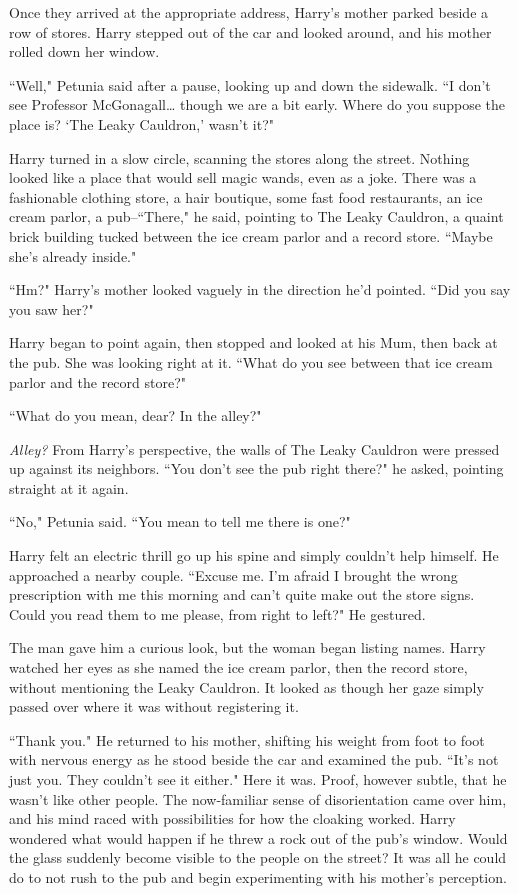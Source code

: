 Once they arrived at the appropriate address, Harry's mother parked beside a row of stores. Harry stepped out of the car and looked around, and his mother rolled down her window.

``Well," Petunia said after a pause, looking up and down the sidewalk. ``I don't see Professor McGonagall{\ldots} though we are a bit early. Where do you suppose the place is? `The Leaky Cauldron,' wasn't it?"

Harry turned in a slow circle, scanning the stores along the street. Nothing looked like a place that would sell magic wands, even as a joke. There was a fashionable clothing store, a hair boutique, some fast food restaurants, an ice cream parlor, a pub\---``There," he said, pointing to The Leaky Cauldron, a quaint brick building tucked between the ice cream parlor and a record store. ``Maybe she's already inside."

``Hm?" Harry's mother looked vaguely in the direction he'd pointed. ``Did you say you saw her?"

Harry began to point again, then stopped and looked at his Mum, then back at the pub. She was looking right at it. ``What do you see between that ice cream parlor and the record store?"

``What do you mean, dear? In the alley?"

\emph{Alley?} From Harry's perspective, the walls of The Leaky Cauldron were pressed up against its neighbors. ``You don't see the pub right there?" he asked, pointing straight at it again.

``No," Petunia said. ``You mean to tell me there is one?"

Harry felt an electric thrill go up his spine and simply couldn't help himself. He approached a nearby couple. ``Excuse me. I'm afraid I brought the wrong prescription with me this morning and can't quite make out the store signs. Could you read them to me please, from right to left?" He gestured.

The man gave him a curious look, but the woman began listing names. Harry watched her eyes as she named the ice cream parlor, then the record store, without mentioning the Leaky Cauldron. It looked as though her gaze simply passed over where it was without registering it.

``Thank you." He returned to his mother, shifting his weight from foot to foot with nervous energy as he stood beside the car and examined the pub. ``It's not just you. They couldn't see it either." Here it was. Proof, however subtle, that he wasn't like other people. The now-familiar sense of disorientation came over him, and his mind raced with possibilities for how the cloaking worked. Harry wondered what would happen if he threw a rock out of the pub's window. Would the glass suddenly become visible to the people on the street? It was all he could do to not rush to the pub and begin experimenting with his mother's perception.

